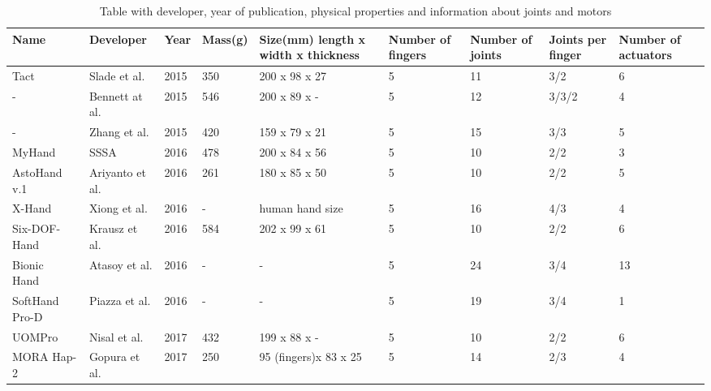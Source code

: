 \documentclass[a4paper, 10pt, conference]{ieeeconf}      %
\begin{document}
\hspace*{-1cm}
\begin{table}

\begin{tabular}{p{2.4cm}|p{1.8cm}|p{0.8cm}|p{1cm}|p{2.2cm}|p{1.2cm}|p{1.2cm}|p{1.2cm}|p{1.5cm}}

Name & Developer & Year & Mass(g) & Size(mm) length x width x thickness & Number of fingers & Number of joints & Joints per finger & Number of actuators\\
\hline
Tact~\cite{tact} & Slade et al. & 2015 & 350 & 200 x 98 x 27 & 5 & 11 & 3/2 & 6\\
\hline
-~\cite{bennett} & Bennett at al. & 2015 & 546 & 200 x 89 x - & 5 & 12 & 3/3/2 & 4\\
\hline
-~\cite{zhang} & Zhang et al. & 2015 & 420 & 159 x 79 x 21 & 5 & 15 & 3/3 & 5\\
\hline
MyHand~\cite{myhand} & SSSA & 2016 & 478 & 200 x 84 x 56 & 5 & 10 & 2/2 & 3\\
\hline
AstoHand v.1~\cite{astohand} & Ariyanto et al. & 2016 & 261 & 180 x 85 x 50 & 5 & 10 & 2/2 & 5\\
\hline
X-Hand~\cite{xhand}& Xiong et al. & 2016 & - & human hand size & 5 & 16 & 4/3 & 4\\
\hline
Six-DOF-Hand~\cite{6dofhand} & Krausz et al. & 2016 & 584 & 202 x 99 x 61 & 5 & 10 & 2/2 & 6\\
\hline
Bionic Hand~\cite{bionichand} & Atasoy et al. & 2016 & - & - & 5 & 24 & 3/4 & 13\\
\hline
SoftHand Pro-D~\cite{softhand} & Piazza et al. & 2016 & - & - & 5 & 19 & 3/4 & 1\\
\hline
UOMPro~\cite{uompro} & Nisal et al. & 2017 & 432 & 199 x 88 x - & 5 & 10 & 2/2 & 6\\
\hline
MORA Hap-2~\cite{morahap2} & Gopura et al. & 2017 & 250 & 95 (fingers)\newline x 83 x 25 & 5 & 14 & 2/3 & 4\\


\end{tabular}

\caption{Table with developer, year of publication, physical properties and information about joints and motors}
\label{table:table1}

\end{table}

\vspace{3cm}

\hspace*{-1cm}
\end{document}
